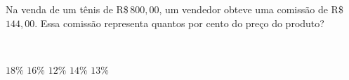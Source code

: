 \parbox{\linewidth}{

Na venda de um tênis de R\$\,$800{,}00$, um vendedor obteve uma comissão de R\$\,$144{,}00$.
Essa comissão representa quantos por cento do preço do produto?}\vspace{2mm}\\\parbox{\linewidth}{

$18$\%
$16$\%
$12$\%
$14$\%
$13$\%

}

